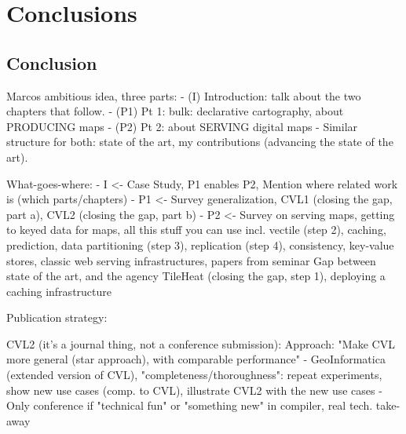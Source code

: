 \documentclass[11pt, oneside]{report}   	%
\begin{document}
\part{Conclusions}
\chapter{Conclusion}






Marcos ambitious idea, three parts:
- (I) Introduction: talk about the two chapters that follow. 
- (P1) Pt 1: bulk: declarative cartography, about PRODUCING maps
- (P2) Pt 2: about SERVING digital maps
- Similar structure for both: state of the art, my contributions (advancing the state of the art).  

What-goes-where:
- I <- Case Study, P1 enables P2, Mention where related work is (which parts/chapters)
- P1 <- 
        Survey generalization, 
        CVL1 (closing the gap, part a), 
        CVL2 (closing the gap, part b)
- P2 <- 
        Survey on serving maps, getting to keyed data for maps, all this stuff you can use 
                incl. vectile (step 2),
                caching,
                prediction,
                data partitioning (step 3), 
                replication (step 4), 
                consistency, 
                key-value stores, 
                classic web serving infrastructures,
                papers from seminar
        Gap between state of the art, and the agency
        TileHeat (closing the gap, step 1), deploying a caching infrastructure
        
Publication strategy:

CVL2 (it's a journal thing, not a conference submission):
Approach: "Make CVL more general (star approach), with comparable performance"
- GeoInformatica (extended version of CVL), "completeness/thoroughness": repeat experiments, show new use cases (comp. to CVL), illustrate CVL2 with the new use cases 
- Only conference if "technical fun" or "something new" in compiler, real tech. take-away
\end{document}
